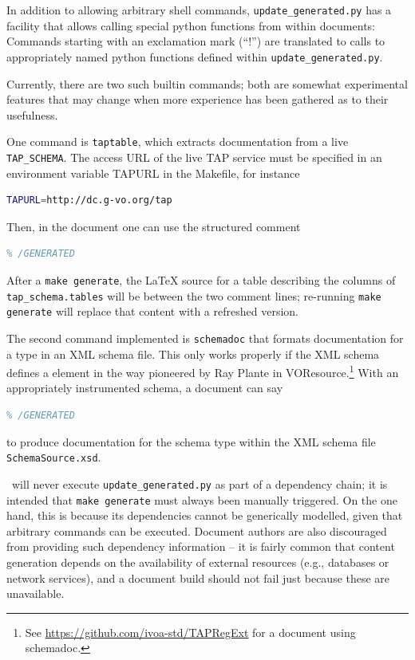 \documentclass[11pt,a4paper]{ivoa}
\begin{document}
In addition to allowing arbitrary shell
commands, \texttt{update\_generated.py} has a facility that allows
calling special python functions from within documents: Commands
starting with an exclamation mark (``!'') are translated to calls to
appropriately named python functions defined within
\texttt{update\_generated.py}.

Currently, there are two such builtin commands; both are somewhat
experimental features that may change when more experience has been
gathered as to their usefulness.

One command is \texttt{taptable}, which extracts documentation from a
live \texttt{TAP\_SCHEMA}.  The access URL of the
live TAP service must be specified in an environment variable TAPURL in
the Makefile, for instance

\begin{lstlisting}[language=sh]
TAPURL=http://dc.g-vo.org/tap
\end{lstlisting}

Then, in the document one can use the structured comment

\begin{lstlisting}[language=TeX]
% GENERATED: !taptable tap_schema.tables
% /GENERATED
\end{lstlisting}

After a \texttt{make generate}, the LaTeX source for a table describing
the columns of \texttt{tap\_schema.tables} will be between the two
comment lines; re-running \texttt{make generate} will replace that
content with a refreshed version.

The second command implemented is \texttt{schemadoc} that formats
documentation for a type in an XML schema file.  This only works
properly if the XML schema defines a  element in
the way pioneered by Ray Plante in
VOResource.\footnote{See
\url{https://github.com/ivoa-std/TAPRegExt} for a document using
schemadoc.}
With an appropriately instrumented schema, a document can say

\begin{lstlisting}[language=TeX]
% GENERATED: !schemadoc SchemaSource.xsd MyType
% /GENERATED
\end{lstlisting}

to produce documentation for the schema type  within
the XML schema file \texttt{SchemaSource.xsd}.

\ivoatex~will never execute \texttt{update\_generated.py} as part of a
dependency chain; it is intended that \texttt{make generate} must always
been manually triggered.  On the one hand, this is because its
dependencies cannot be generically modelled, given that arbitrary
commands can be executed.  Document authors are also discouraged from
providing such dependency information -- it is fairly common that
content generation depends on the availability of external resources
(e.g., databases or network services), and a document build should not
fail just because these are unavailable.
\end{document}
